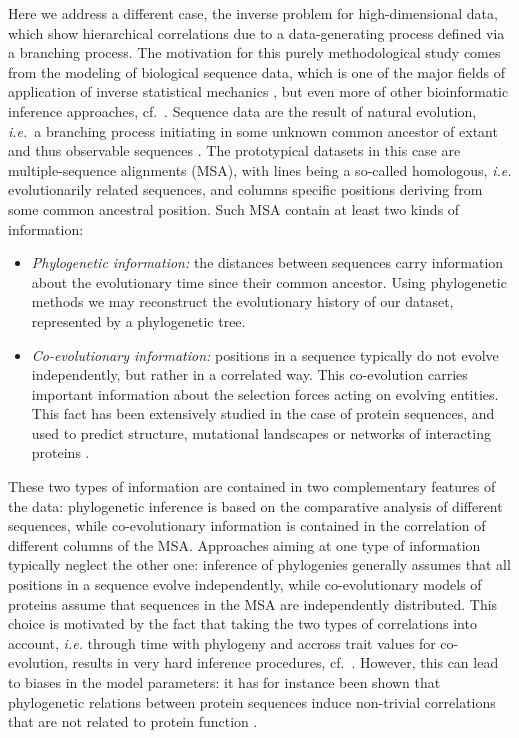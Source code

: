 \documentclass[preprint,amsmath,amssymb,superscriptaddress,showpacs,pre]{revtex4-1}
\begin{document}
Here we address a different case, the inverse problem for high-dimensional data, which show hierarchical correlations due to a data-generating process defined via a branching process. The motivation for this purely methodological study comes from the modeling of biological sequence data, which is one of the major fields of application of inverse statistical mechanics \cite{levy_potts_2017,cocco_inverse_2018}, but even more of other bioinformatic inference approaches, cf.~\cite{durbin1998biological,felsenstein2004inferring}. Sequence data are the result of natural evolution, {\em i.e.}~a branching process initiating in some unknown common ancestor of extant and thus observable sequences \cite{sayers_genbank_2019,uniprotconsortium_uniprot_2018,el2019pfam}. The prototypical datasets in this case are multiple-sequence alignments (MSA), with lines being a so-called homologous, {\em i.e.} evolutionarily related sequences, and columns specific positions deriving from some common ancestral position. Such MSA contain at least two kinds of information:
\begin{itemize}
    \item {\it Phylogenetic information:} the distances between sequences carry information about the evolutionary time since their common ancestor. Using phylogenetic methods \cite{felsenstein_phylogenies_1988,felsenstein2004inferring} we may reconstruct the evolutionary history of our dataset, represented by a phylogenetic tree.  
    \item {\it Co-evolutionary information:} positions in a sequence typically do not evolve independently, but rather in a correlated way. This co-evolution carries important information about the selection forces acting on evolving entities. This fact has been extensively studied in the case of protein sequences, and used to predict structure, mutational landscapes or networks of interacting proteins \cite{levy_potts_2017,cocco_inverse_2018}.  
\end{itemize}
These two types of information are contained in two complementary features of the data: phylogenetic inference is based on the comparative analysis of different sequences, while co-evolutionary information is contained in the correlation of different columns of the MSA. Approaches aiming at one type of information typically neglect the other one: inference of phylogenies generally assumes that all positions in a sequence evolve independently, while co-evolutionary models of proteins assume that sequences in the MSA are independently distributed. This choice is motivated by the fact that taking the two types of correlations into account, \emph{i.e.} through time with phylogeny and accross trait values for co-evolution, results in very hard inference procedures, cf.~\cite{obermayer2014inverse,rodriguez2019toward}. 
However, this can lead to biases in the model parameters: it has for instance been shown that phylogenetic relations between protein sequences induce non-trivial correlations that are not related to protein function \cite{qin_power_2018,horta2020phylogenetic}. 
\end{document}
